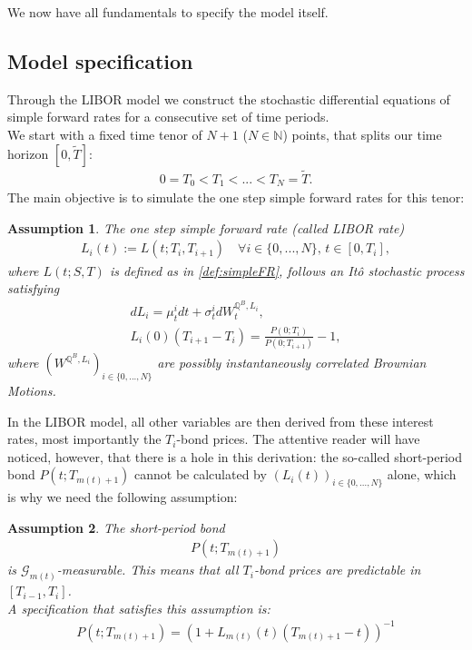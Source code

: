 \documentclass[12pt]{article}
\newtheorem{assumption}{Assumption}[section]
\begin{document}
	We now have all fundamentals to specify the model itself.
	
	\subsection{Model specification}\label{sec:libModel}
	Through the LIBOR model we construct the stochastic differential equations of simple forward rates for a consecutive set of time periods.\\
	We start with a fixed time tenor of $N+1$ ($N \in \mathbb{N}$) points, that splits our time horizon $[0,\tilde{T}]$:
	\begin{align*}
		0 = T_0 < T_1 < ... < T_N = \tilde{T}.
	\end{align*}
	The main objective is to simulate the one step simple forward rates for this tenor:
	\begin{assumption}\label{as:LIBORisItoProcess}
		The one step simple forward rate (called LIBOR rate)
		\begin{align*}
			L_i(t) := L(t;T_i, T_{i+1}) \quad \forall i \in \{0, ..., N\}\text{, } t\in[0,T_i],
		\end{align*}
		where $L(t;S, T)$ is defined as in \cref{def:simpleFR},
		follows an Itô stochastic process satisfying
		\begin{align}
			dL_i = \mu^i_t dt + \sigma^i_t dW^{\mathbb{Q}^B, L_i}_t,\label{eq:LMMSDE}\\
			L_i(0)(T_{i+1} - T_i) = \frac{P(0;T_i)}{P(0;T_{i+1})} - 1,
		\end{align}
		where $(W^{\mathbb{Q}^B, L_i})_{i\in \{0, ..., N\}}$ are possibly instantaneously correlated Brownian Motions.
	\end{assumption}
	In the LIBOR model, all other variables are then derived from these interest rates, most importantly the $T_i$-bond prices. The attentive reader will have noticed, however, that there is a hole in this derivation: the so-called short-period bond $P(t;T_{m(t)+1})$ cannot be calculated by $\left(L_i(t)\right)_{i\in\{0, ..., N\}}$ alone, which is why we need the following assumption:
	\begin{assumption}\label{as:LMMShortPeriodBond}
		The short-period bond
		\begin{align*}
			P(t;T_{m(t)+1})
		\end{align*}
		is $\mathcal{G}_{m(t)}$-measurable. This means that all $T_i$-bond prices are predictable in $[T_{i-1},T_i]$.\\
		A specification that satisfies this assumption is:
		\begin{align*}
			P(t;T_{m(t)+1}) = \left(1 + L_{m(t)}(t)\left(T_{m(t)+1} - t\right)\right)^{-1}
		\end{align*}
	\end{assumption}
\end{document}
